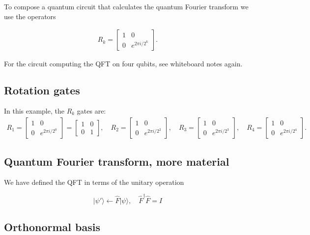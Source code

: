 \documentclass[%
oneside,                 %
final,                   %
10pt]{article}
\begin{document}
To compose a quantum circuit that calculates the quantum Fourier
transform we use the operators

\begin{align*}
R_k = 
\begin{bmatrix}
1 & 0 \\
0 & e^{2\pi i/2^k}
\end{bmatrix}.
\end{align*}

For the circuit computing the QFT on four qubits, see whiteboard notes again.

\subsection{Rotation gates}

In this example, the \(R_k\) gates are:
\begin{align*}
R_1 = \begin{bmatrix}
1 & 0 \\
0 & e^{2 \pi i /2^0}
\end{bmatrix} = 
\begin{bmatrix}
1 & 0 \\
0 & 1
\end{bmatrix}, \quad 
R_2 = \begin{bmatrix}
1 & 0 \\
0 & e^{2 \pi i /2^2}
\end{bmatrix}, \quad 
R_3 = \begin{bmatrix}
1 & 0 \\
0 & e^{2 \pi i /2^3}
\end{bmatrix}, \quad 
R_4 = \begin{bmatrix}
1 & 0 \\
0 & e^{2 \pi i /2^4}
\end{bmatrix}.
\end{align*}

\subsection{Quantum Fourier transform, more material}

We have defined the QFT in terms of
the unitary operation

\[
    \vert \psi'\rangle \leftarrow \hat{F}\vert \psi\rangle, \quad \hat{F}^\dagger \hat{F} = I
\]

\subsection{Orthonormal basis}
\end{document}
